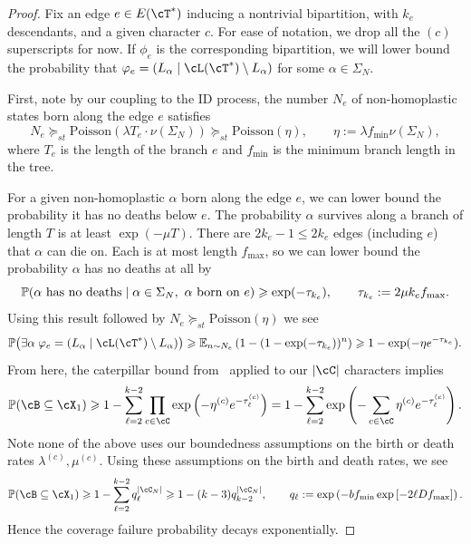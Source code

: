 \begin{proof}
Fix an edge $e \in E(\cT^*)$ inducing a nontrivial bipartition, with $k_e$ descendants, and a given character $c$.
For ease of notation, we drop all the $(c)$ superscripts for now. If $\phi_e$ is the
corresponding bipartition, we will lower bound the probability that
$\phi_e = (L_\alpha \mid \cL(\cT^*) \setminus L_\alpha)$ for some $\alpha \in \Sigma_N$.

First, note by our coupling to the ID process, the number $N_e$ of non-homoplastic
states born along the edge $e$ satisfies
%
\[N_e \succeq_{st} \mathrm{Poisson}(\lambda T_e \cdot \nu(\Sigma_N)) \succeq_{st} \mathrm{Poisson}(\eta), \qquad \eta := \lambda f_{\min} \nu(\Sigma_N),\]
%
\noindent where $T_e$ is the length of the branch $e$ and $f_{\min}$ is the minimum branch length in the tree.

For a given non-homoplastic $\alpha$ born along the edge $e$, we can lower bound the probability it has no deaths below $e$. The probability $\alpha$ survives along a branch of length $T$ is at least $\exp(-\mu T)$. There are $2k_e - 1 \leq 2k_e$ edges (including $e$) that $\alpha$ can die on. Each is at most length $f_{\max}$, so we can lower bound the probability $\alpha$ has no deaths at all by
%
\[\P(\alpha \text{ has no deaths} \mid \alpha \in \Sigma_N,\ \alpha \text{ born on } e) \geq \exp(- \tau_{k_e}), \qquad \tau_{k_e} := 2\mu k_e f_{\max}.\]
%
\noindent Using this result followed by $N_e \succeq_{st} \mathrm{Poisson}(\eta)$ we see
%
\[\P\bigl(\exists\alpha \; \phi_e = (L_\alpha \mid \cL(\cT^*) \setminus L_\alpha)\bigr) \geq \E_{n \sim N_e} \left(1-(1-\exp(-\tau_{k_e}))^n\right) \geq 1-\exp(-\eta e^{-\tau_{k_e}}).\]
%
From here, the caterpillar bound from~\cite{mcnulty2026_improved_bipartition_cover_bound} applied to our $|\cC|$ characters implies
%
\[\P(\cB \subseteq \cX_1) \geq 1 - \sum_{\ell=2}^{k-2} \prod_{c \in \cC}\exp\left(-\eta^{(c)} e^{-\tau_{\ell}^{(c)}}\right) =  1 - \sum_{\ell=2}^{k-2} \exp\left(-\sum_{c \in \cC}\eta^{(c)} e^{-\tau_{\ell}^{(c)}}\right).\]
%
\noindent Note none of the above uses our boundedness assumptions on the birth or death rates $\lambda^{(c)}, \mu^{(c)}$. Using these assumptions on the birth and death rates, we see
%
\[\P(\cB \subseteq \cX_1) \geq 1 - \sum_{\ell=2}^{k-2}q_\ell^{|\cC_N|} \geq 1-(k-3)q_{k-2}^{|\cC_N|}, \qquad q_\ell := \exp\left(-bf_{\min} \exp\left[-2\ell Df_{\max}\right]\right).\]
%
\noindent Hence the coverage failure probability decays exponentially.
\end{proof}

